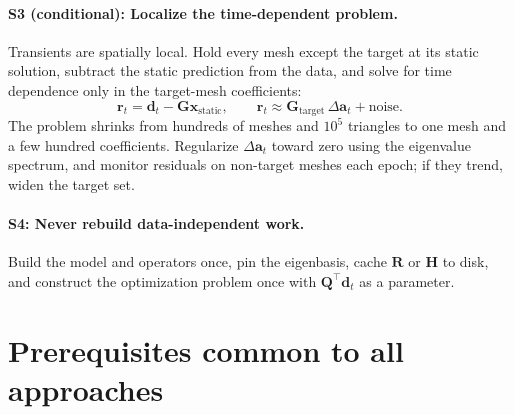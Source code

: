 \documentclass[11pt]{article}
\newcommand{\vect}[1]{\bm{#1}}
\newcommand{\mat}[1]{\mathbf{#1}}
\begin{document}
\paragraph{S3 (conditional): Localize the time-dependent problem.}
Transients are spatially local. Hold every mesh except the target at its static solution, subtract the static prediction from the data, and solve for time dependence only in the target-mesh coefficients:
\begin{equation}
\vect{r}_t = \vect{d}_t - \mat{G}\vect{x}_{\mathrm{static}}, \qquad \vect{r}_t \approx \mat{G}_{\mathrm{target}}\,\Delta\vect{a}_t + \text{noise}.
\end{equation}
The problem shrinks from hundreds of meshes and $10^5$ triangles to one mesh and a few hundred coefficients. Regularize $\Delta\vect{a}_t$ toward zero using the eigenvalue spectrum, and monitor residuals on non-target meshes each epoch; if they trend, widen the target set.

\paragraph{S4: Never rebuild data-independent work.}
Build the model and operators once, pin the eigenbasis, cache $\mat{R}$ or $\mat{H}$ to disk, and construct the optimization problem once with $\mat{Q}^{\!\top}\vect{d}_t$ as a parameter.

\section{Prerequisites common to all approaches}
\end{document}
